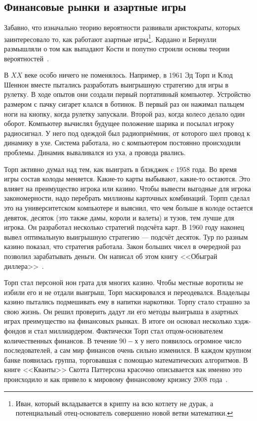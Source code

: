 \documentclass[12pt, a4paper, oneside]{article}
\begin{document}
\subsection{Финансовые рынки и азартные игры} 

Забавно, что изначально теорию вероятности развивали аристократы, которых заинтересовало то, как работают азартные игры\footnote{Иван, который вкладывается в крипту на всю котлету не дурак, а потенциальный отец-основатель совершенно новой ветви математики.}. Кардано и Бернулли размышляли о том как выпадают Кости и попутно строили основы теории вероятностей~\cite{ref:gnedenko}.

В $XX$ веке особо ничего не поменялось. Например, в $1961$ Эд Торп и Клод Шеннон вместе пытались разработать выигрышную стратегию для игры в рулетку. В ходе опытов они создали первый портативный компьютер. Устройство размером с пачку сигарет клался в ботинок. В первый раз он нажимал пальцем ноги на кнопку, когда рулетку запускали. Второй раз, когда колесо делало один оборот. Компьютер вычислял будущее положение шарика и посылал игроку радиосигнал. У него под одеждой был радиоприёмник, от которого шел провод к динамику в ухе. Система работала, но с компьютером постоянно происходили проблемы. Динамик вываливался из уха, а провода рвались. 

Торп активно думал над тем, как выиграть в блэкджек c $1958$ года. Во время игры состав колоды меняется. Какие-то карты выбывают, какие-то остаются. Это влияет на преимущество игрока или казино. Чтобы вывести выгодные для игрока закономерности, надо перебрать миллионы карточных комбинаций. Торпп сделал это на университетском компьютере и выяснил, что чем больше в колоде остается девяток, десяток (это также дамы, короли и валеты) и тузов, тем лучше для игрока. Он разработал несколько стратегий подсчёта карт. В 1960 году наконец вывел оптимальную выигрышную стратегию — подсчёт десяток. Тур по разным казино показал, что стратегия работала. Закон больших чисел в очередной раз позволил зарабатывать деньги. Он написал об этом книгу <<Обыграй диллера>>~\cite{ref:torp}.  

Торп стал персоной нон грата для многих казино. Чтобы местные воротилы не избили его и не отдали выигрыш, Торп маскировался и переодевался. Владельцы казино пытались подмешивать ему в напитки наркотики. Торпу стало страшно за свою жизнь. Он решил проверить дадут ли его методы выигрыша в азартных играх преимущество на финансовых рынках. В итоге он основал несколько хэдж-фондов и стал миллиардером. Фактически Торп стал отцом-основателем количественных финансов. В течение $90-$х у него появилось огромное число последователей, а сам мир финансов очень сильно изменился. В каждом крупном банке появилась группа, торговавшая с помощью математических алгоритмов. В книге <<Кванты>> Скотта Паттерсона красочно описывается как именно это происходило и  как привело к мировому финансовому кризису $2008$ года~\cite{ref:quant}. 
\end{document}
